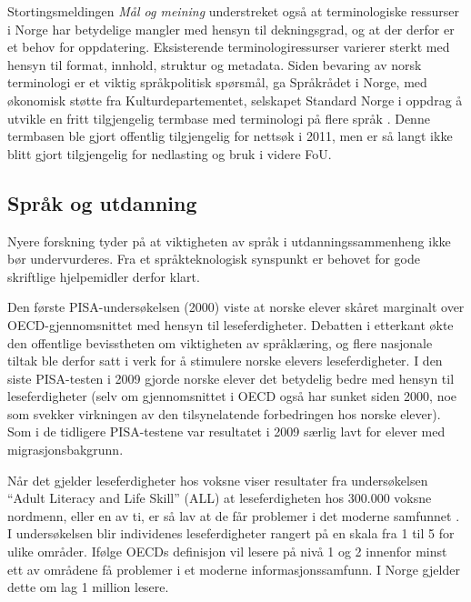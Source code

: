 \begin{multicols}{2}
Stortingsmeldingen \textit{Mål og meining} understreket også at terminologiske ressurser i Norge har betydelige mangler med hensyn til dekningsgrad, og at der derfor er et behov for oppdatering.  Eksisterende terminologiressurser varierer sterkt med hensyn til format, innhold, struktur og metadata. 
Siden bevaring av norsk terminologi er et viktig språkpolitisk spørsmål, ga Språkrådet i Norge, med økonomisk støtte fra Kulturdepartementet, selskapet Standard Norge i oppdrag å utvikle en fritt tilgjengelig termbase med terminologi på flere språk \cite{drosdal2010}. 
Denne termbasen ble gjort offentlig tilgjengelig for nettsøk i 2011, men er så langt ikke blitt gjort tilgjengelig for nedlasting og bruk i videre FoU.
 
\subsection{Språk og utdanning}

Nyere forskning tyder på at viktigheten av språk i utdanningssammenheng ikke bør undervurderes. 
Fra et språkteknologisk synspunkt er behovet for gode skriftlige hjelpemidler derfor klart.
\columnbreak

Den første PISA-undersøkelsen (2000) viste at norske elever skåret marginalt over OECD-gjennomsnittet med hensyn til leseferdigheter. 
Debatten i etterkant økte den offentlige bevisstheten om viktigheten av språklæring, og flere nasjonale tiltak ble derfor satt i verk for å stimulere norske elevers  leseferdigheter. 
I den siste PISA-testen i 2009 \cite{pisa2009eng} gjorde norske elever det betydelig bedre med hensyn til leseferdigheter (selv om gjennomsnittet i OECD også har sunket siden 2000, noe som svekker virkningen av den tilsynelatende forbedringen hos norske elever). 
Som i de tidligere PISA-testene var resultatet i 2009 særlig lavt for elever med migrasjonsbakgrunn.


Når det gjelder leseferdigheter hos voksne viser resultater fra undersøkelsen ``Adult Literacy and Life Skill'' (ALL) at leseferdigheten hos 300.000 voksne nordmenn, eller en av ti, er så lav at de får problemer i det moderne samfunnet \cite{gab:2005}. 
I undersøkelsen blir individenes leseferdigheter rangert på en skala fra 1 til 5 for ulike områder. Ifølge OECDs definisjon vil lesere på nivå 1 og 2 innenfor minst ett av områdene få problemer i et moderne informasjonssamfunn. I Norge gjelder dette om lag 1 million lesere.


\end{multicols}
